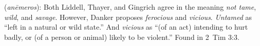 \item[Vicious,]

(\textit{anēmeros}):
Both Liddell, Thayer, and Gingrich agree in the meaning \emph{not tame}, \emph{wild}, and \emph{savage}. However, Danker proposes \emph{ferocious} and \emph{vicious}. \emph{Untamed} as ``left in a natural or wild state.'' And \emph{vicious} as ``(of an act) intending to hurt badly, or (of a person or animal) likely to be violent.''
Found in 2~Tim 3:3.
